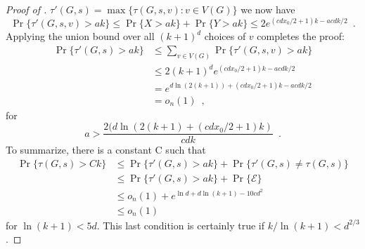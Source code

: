 \documentclass{patmorin}
\begin{document}
\begin{proof}[Proof of ]
$\tau'(G,s)=\max\{\tau(G,s,v):v\in V(G)\}$
 we now have
\[
   \Pr\{ \tau'(G,s,v) > ak\} \le \Pr\{X > ak\} + \Pr\{Y>ak\}
          \le 2 e^{(cdx_0/2+1)k - acdk/2} \enspace .
\]
Applying the union bound over all $(k+1)^d$ choices of $v$ completes the proof:
\begin{align*}
   \Pr\{\tau'(G,s) > ak\} 
     & \le \sum_{v\in V(G)} \Pr\{\tau'(G,s,v) > ak\}  \\
     & \le 2(k+1)^d e^{(cdx_0/2+1)k - acdk/2} \\
     & = e^{d\ln(2(k+1))+(cdx_0/2+1)k - acdk/2} \\
     & = o_n(1) \enspace ,
\end{align*}
for
\[
   a > \frac{2(d\ln(2(k+1)+(cdx_0/2+1)k)}{cdk} \enspace .
\]
To summarize, there is a constant C such that 
\begin{align*}
   \Pr\{\tau(G,s) > Ck\} 
     & \le \Pr\{\tau'(G,s) > ak\} + \Pr\{\tau'(G,s)\neq \tau(G,s)\} \\
     & \le \Pr\{\tau'(G,s) > ak\} + \Pr\{\mathcal{E}\} \\
     & \le o_n(1) + e^{\ln d + d\ln(k+1) - 10cd^2} \\
     & \le o_n(1)
\end{align*}
for $\ln(k+1) < 5d$.  This last condition is certainly true
if $k/\ln(k+1) < d^{2/3}$.  
\end{proof}

\end{document}
